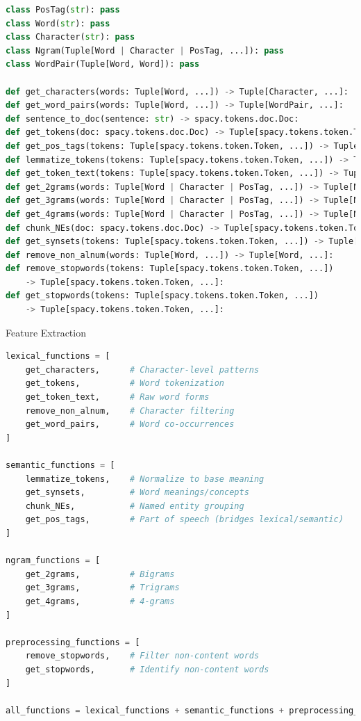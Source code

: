 \documentclass{beamer}
\begin{document}
\begin{frame}[fragile]{}
    \begin{lstlisting}[language=Python]
class PosTag(str): pass
class Word(str): pass
class Character(str): pass
class Ngram(Tuple[Word | Character | PosTag, ...]): pass
class WordPair(Tuple[Word, Word]): pass

def get_characters(words: Tuple[Word, ...]) -> Tuple[Character, ...]:
def get_word_pairs(words: Tuple[Word, ...]) -> Tuple[WordPair, ...]:
def sentence_to_doc(sentence: str) -> spacy.tokens.doc.Doc:
def get_tokens(doc: spacy.tokens.doc.Doc) -> Tuple[spacy.tokens.token.Token, ...]:
def get_pos_tags(tokens: Tuple[spacy.tokens.token.Token, ...]) -> Tuple[PosTag, ...]:
def lemmatize_tokens(tokens: Tuple[spacy.tokens.token.Token, ...]) -> Tuple[Word, ...]:
def get_token_text(tokens: Tuple[spacy.tokens.token.Token, ...]) -> Tuple[Word, ...]:
def get_2grams(words: Tuple[Word | Character | PosTag, ...]) -> Tuple[Ngram, ...]:
def get_3grams(words: Tuple[Word | Character | PosTag, ...]) -> Tuple[Ngram, ...]:
def get_4grams(words: Tuple[Word | Character | PosTag, ...]) -> Tuple[Ngram, ...]:
def chunk_NEs(doc: spacy.tokens.doc.Doc) -> Tuple[spacy.tokens.token.Token, ...]:
def get_synsets(tokens: Tuple[spacy.tokens.token.Token, ...]) -> Tuple[Word, ...]:
def remove_non_alnum(words: Tuple[Word, ...]) -> Tuple[Word, ...]:
def remove_stopwords(tokens: Tuple[spacy.tokens.token.Token, ...])
    -> Tuple[spacy.tokens.token.Token, ...]:
def get_stopwords(tokens: Tuple[spacy.tokens.token.Token, ...])
    -> Tuple[spacy.tokens.token.Token, ...]:
    \end{lstlisting}
\end{frame}

\begin{frame}[fragile]{Feature Extraction}
    \begin{lstlisting}[language=Python]
lexical_functions = [
    get_characters,      # Character-level patterns
    get_tokens,          # Word tokenization
    get_token_text,      # Raw word forms
    remove_non_alnum,    # Character filtering
    get_word_pairs,      # Word co-occurrences
]

semantic_functions = [
    lemmatize_tokens,    # Normalize to base meaning
    get_synsets,         # Word meanings/concepts
    chunk_NEs,           # Named entity grouping
    get_pos_tags,        # Part of speech (bridges lexical/semantic)
]

ngram_functions = [
    get_2grams,          # Bigrams
    get_3grams,          # Trigrams
    get_4grams,          # 4-grams
]

preprocessing_functions = [
    remove_stopwords,    # Filter non-content words
    get_stopwords,       # Identify non-content words
]

all_functions = lexical_functions + semantic_functions + preprocessing_functions
    \end{lstlisting}
\end{frame}
\end{document}

